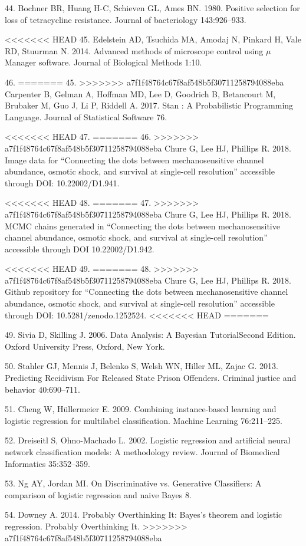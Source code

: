 \hypertarget{ref-bochner1980}{}
44.
Bochner
BR,
Huang
H-C,
Schieven
GL,
Ames
BN.
1980.
Positive
selection
for
loss
of
tetracycline
resistance.
Journal
of
bacteriology
143:926--933.

<<<<<<< HEAD
\hypertarget{ref-edelstein2014}{}
45.
Edelstein
AD,
Tsuchida
MA,
Amodaj
N,
Pinkard
H,
Vale
RD,
Stuurman
N.
2014.
Advanced
methods
of
microscope
control
using
\(\mu\)Manager
software.
Journal
of
Biological
Methods
1:10.

\hypertarget{ref-carpenter2017}{}
46.
=======
\hypertarget{ref-carpenter2017}{}
45.
>>>>>>> a7f1f48764c67f8af548b5f30711258794088eba
Carpenter
B,
Gelman
A,
Hoffman
MD,
Lee D,
Goodrich
B,
Betancourt
M,
Brubaker
M, Guo
J, Li
P,
Riddell
A.
2017.
Stan :
A
Probabilistic
Programming
Language.
Journal
of
Statistical
Software
76.

\hypertarget{ref-chure2018a}{}
<<<<<<< HEAD
47.
=======
46.
>>>>>>> a7f1f48764c67f8af548b5f30711258794088eba
Chure
G, Lee
HJ,
Phillips
R.
2018.
Image
data
for
``Connecting
the
dots
between
mechanosensitive
channel
abundance,
osmotic
shock,
and
survival
at
single-cell
resolution''
accessible
through
DOI:
10.22002/D1.941.

\hypertarget{ref-chure2018}{}
<<<<<<< HEAD
48.
=======
47.
>>>>>>> a7f1f48764c67f8af548b5f30711258794088eba
Chure
G, Lee
HJ,
Phillips
R.
2018.
MCMC
chains
generated
in
``Connecting
the
dots
between
mechanosensitive
channel
abundance,
osmotic
shock,
and
survival
at
single-cell
resolution''
accessible
through
DOI
10.22002/D1.942.

\hypertarget{ref-chure2018b}{}
<<<<<<< HEAD
49.
=======
48.
>>>>>>> a7f1f48764c67f8af548b5f30711258794088eba
Chure
G, Lee
HJ,
Phillips
R.
2018.
Github
repository
for
``Connecting
the
dots
between
mechanosensitive
channel
abundance,
osmotic
shock,
and
survival
at
single-cell
resolution''
accessible
through
DOI:
10.5281/zenodo.1252524.
<<<<<<< HEAD
=======

\hypertarget{ref-sivia2006}{}
49.
Sivia
D,
Skilling
J.
2006.
Data
Analysis:
A
Bayesian
TutorialSecond
Edition.
Oxford
University
Press,
Oxford,
New
York.

\hypertarget{ref-stahler2013}{}
50.
Stahler
GJ,
Mennis
J,
Belenko
S,
Welsh
WN,
Hiller
ML,
Zajac
G.
2013.
Predicting
Recidivism
For
Released
State
Prison
Offenders.
Criminal
justice
and
behavior
40:690--711.

\hypertarget{ref-cheng2009}{}
51.
Cheng
W,
Hüllermeier
E.
2009.
Combining
instance-based
learning
and
logistic
regression
for
multilabel
classification.
Machine
Learning
76:211--225.

\hypertarget{ref-dreiseitl2002}{}
52.
Dreiseitl
S,
Ohno-Machado
L.
2002.
Logistic
regression
and
artificial
neural
network
classification
models:
A
methodology
review.
Journal
of
Biomedical
Informatics
35:352--359.

\hypertarget{ref-ng}{}
53. Ng
AY,
Jordan
MI. On
Discriminative
vs.
Generative
Classifiers:
A
comparison
of
logistic
regression
and
naive
Bayes
8.

\hypertarget{ref-downey2014}{}
54.
Downey
A.
2014.
Probably
Overthinking
It:
Bayes's
theorem
and
logistic
regression.
Probably
Overthinking
It.
>>>>>>> a7f1f48764c67f8af548b5f30711258794088eba
